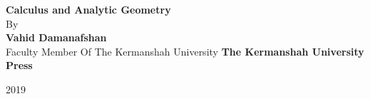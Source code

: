 \cleardoublepage
\thispagestyle{empty}

\begin{latin}
\begin{center}
\vspace*{3cm}
{\huge \bfseries Calculus and Analytic Geometry}
\\[6cm]
By\\[2mm]
{\Large \bfseries Vahid Damanafshan}
\\[2mm]
Faculty Member Of The Kermanshah University
\vfill
\textbf{\large The Kermanshah University Press}

2019
\end{center}
\end{latin}
